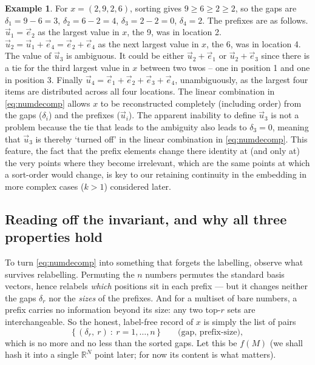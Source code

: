 \documentclass[11pt,a4paper]{article}
\theoremstyle{definition}
\newtheorem{example}[definition]{Example}
\theoremstyle{plain}
\newcommand{\R}{\mathbb{R}}
\begin{document}
\begin{example}\label{ex:numbers}
For $x=(2,9,2,6)$, sorting gives $9\ge6\ge2\ge2$, so the gaps are
$\delta_1=9{-}6=3$, $\delta_2=6{-}2=4$, $\delta_3=2{-}2=0$, $\delta_4=2$. The
prefixes are as follows.  $\vec u_1=\vec e_2$ as the largest value in $x$, the 9,  was in location 2.  $\vec u_2=\vec u_1 + \vec e_4 = \vec e_2+\vec e_4$ as the next largest value in $x$, the 6, was in location 4. The value of $\vec u_3$ is ambiguous. It could be either $\vec u_2+\vec e_1$ or $\vec u_2 + \vec e_3$ since there is a tie for the third largest value in $x$ between two twos -- one in position 1 and one in position 3. Finally $\vec u_4=\vec e_1+\vec e_2+\vec e_3 +\vec e_4$,  unambiguously, as the largest four items are distributed across all four locations.  The linear combination in \eqref{eq:numdecomp} allows $x$ to be reconstructed completely (including order) from the gaps ($\delta_i$) and the prefixes ($\vec u_i$).  The apparent inability to define $\vec u_3$ is not a problem because the tie that leads to the ambiguity also leads to $\delta_3=0$, meaning that $\vec u_3$ is thereby `turned off' in the linear combination in \eqref{eq:numdecomp}. This feature, the fact that the prefix elements change there identity at (and only at) the very points where they become irrelevant, which are the same points at which a sort-order would change, is key to our retaining continuity in the embedding in more complex cases ($k>1$) considered later.
\end{example}

\subsection{Reading off the invariant, and why all three properties hold}

To turn \eqref{eq:numdecomp} into something that forgets the labelling, observe
what survives relabelling. Permuting the $n$ numbers permutes the standard basis
vectors, hence relabels \emph{which} positions sit in each prefix --- but it
changes neither the gaps $\delta_r$ nor the \emph{sizes} of the prefixes. And
for a multiset of bare numbers, a prefix carries no information beyond its
size: any two top-$r$ sets are interchangeable. So the honest, label-free record
of $x$ is simply the list of pairs
\[
   \bigl\{\,(\delta_r,\ r)\ :\ r=1,\dots,n\,\bigr\}
   \qquad\text{(gap, prefix-size)},
\]
which is no more and no less than the sorted gaps. Let this be $f(M)$ (we shall
hash it into a single $\R^N$ point later; for now its content is what matters).
\end{document}
